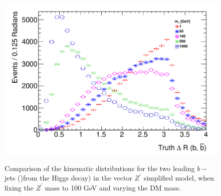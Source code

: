 \begin{figure}[hbpt!]
{		\includegraphics[width=0.47\linewidth]{figures/EW/monoH/zpzp100/truth_bb_deltar} %
	}
	\hfill
	\caption{Comparison of the kinematic distributions for the two leading $b-$ jets ()from the Higgs decay) in the vector $Z^\prime$ simplified model, 
		when fixing the $Z^\prime$ mass to 100 GeV and varying the DM mass. 
		\label{fig:VectorHbb_100}}
\end{figure}

